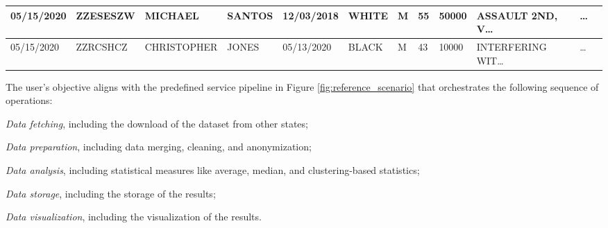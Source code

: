 \begin{table*}[!t]
\begin{adjustbox}{max totalsize={.99\linewidth}{\textheight},center}
\begin{tabular}{|l|l|l|l|l|l|l|l|l|l|l|l|}
      05/15/2020             & ZZESESZW    & MICHAEL        & SANTOS         & 12/03/2018   & WHITE         & M               & 55           & 50000         & ASSAULT 2ND, V\dots  & \dots          \\ \hline
      05/15/2020             & ZZRCSHCZ    & CHRISTOPHER    & JONES          & 05/13/2020   & BLACK         & M               & 43           & 10000         & INTERFERING WIT\dots & \dots          \\ \hline
    \end{tabular}
    \egroup
  \end{adjustbox}

\end{table*}


The user's objective aligns with the predefined service pipeline in Figure \ref{fig:reference_scenario} that orchestrates the following sequence of operations:
\begin{enumerate*}[label=(\roman*)]
  \item \emph{Data fetching}, including the download of the dataset from other states;
  \item \emph{Data preparation}, including data merging, cleaning, and anonymization;
  \item \emph{Data analysis}, including statistical measures like average, median, and clustering-based statistics;
  \item \emph{Data storage}, including the storage of the results;
  \item \emph{Data visualization}, including the visualization of the results.
\end{enumerate*}

